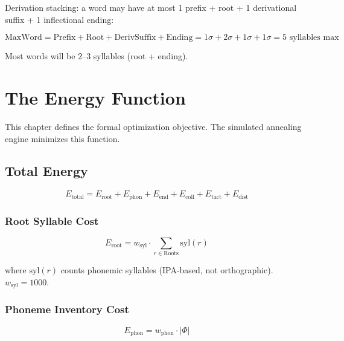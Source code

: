 \documentclass[12pt]{book}
\begin{document}
\noindent Derivation stacking: a word may have at most 1 prefix + root + 1 derivational suffix + 1 inflectional ending:

\begin{equation}
\text{MaxWord} = \text{Prefix} + \text{Root} + \text{DerivSuffix} + \text{Ending}
= 1\sigma + 2\sigma + 1\sigma + 1\sigma = 5 \text{ syllables max}
\end{equation}

Most words will be 2--3 syllables (root + ending).


\chapter{The Energy Function}
\label{ch:energy}

This chapter defines the formal optimization objective. The simulated
annealing engine minimizes this function.

\section{Total Energy}

\begin{equation}
E_{\text{total}} = E_{\text{root}} + E_{\text{phon}} + E_{\text{end}} + E_{\text{coll}} + E_{\text{tact}} + E_{\text{dist}}
\end{equation}

\subsection{Root Syllable Cost}

\begin{equation}
E_{\text{root}} = w_{\text{syl}} \cdot \sum_{r \in \text{Roots}} \text{syl}(r)
\end{equation}

where $\text{syl}(r)$ counts phonemic syllables (IPA-based, not orthographic).
$w_{\text{syl}} = 1000$.

\subsection{Phoneme Inventory Cost}

\begin{equation}
E_{\text{phon}} = w_{\text{phon}} \cdot |\Phi|
\end{equation}
\end{document}
